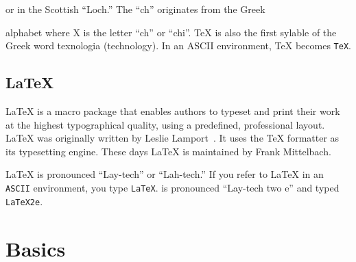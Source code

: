  or in the Scottish ``Loch.'' The ``ch'' originates from the Greek

alphabet where X is the letter ``ch'' or ``chi''. \TeX{} is also the first sylable
of the Greek word texnologia (technology). In an ASCII environment, \TeX{}
becomes \texttt{TeX}.

\subsection{\LaTeX}
 
\LaTeX{} is a macro package that enables authors to typeset and print
their work at the highest typographical quality, using a predefined,
professional layout. \LaTeX{} was originally written by
Leslie Lamport~\cite{manual}. It uses the
\TeX{} formatter as its typesetting engine. These days \LaTeX{} is maintained
by Frank Mittelbach.


\LaTeX{} is pronounced ``Lay-tech'' or ``Lah-tech.'' If you refer to
\LaTeX{} in an \texttt{ASCII} environment, you type \texttt{LaTeX}.
\LaTeXe{} is pronounced ``Lay-tech two e'' and typed \texttt{LaTeX2e}.


%

\section{Basics}
 
